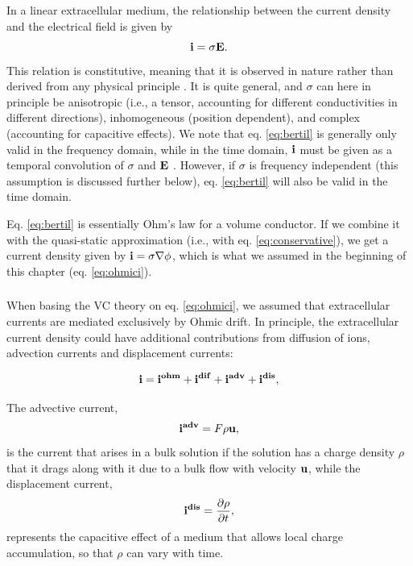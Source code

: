 \subsubsection{ }
In a linear extracellular medium, the relationship between the current density and the electrical field is given by
\begin{equation}
{\bf i} = \sigma {\bf E}.
\label{eq:bertil}
\end{equation}
This relation is constitutive, meaning that it is observed in nature rather than derived from any physical principle \citep{Nunez2006, Pettersen2012}. It is quite general, and $\sigma$ can here in principle be anisotropic (i.e., a tensor, accounting for different conductivities in different directions), inhomogeneous (position dependent), and complex (accounting for capacitive effects). We note that eq. \ref{eq:bertil} is generally only valid in the frequency domain, while in the time domain, ${\bf i}$ must be given as a temporal convolution of $\sigma$ and ${\bf E}$ \cite{Bedard2009}. However, if $\sigma$ is frequency independent (this assumption is discussed further below), eq. \ref{eq:bertil} will also be valid in the time domain.

Eq. \ref{eq:bertil} is essentially Ohm's law for a volume conductor. If we combine it with 
the quasi-static approximation (i.e., with eq. \ref{eq:conservative}), we get a current density given by ${\bf i} = \sigma \nabla \phi$, which is what we assumed in the beginning of this chapter (eq. \ref{eq:ohmici}).


\subsubsection{}
\label{sec:onlyohmic}
When basing the VC theory on eq. \ref{eq:ohmici}, we assumed that extracellular currents are mediated exclusively by Ohmic drift. In principle, the extracellular current density could have additional contributions from diffusion of ions, advection currents and displacement currents:

\begin{equation}
{\bf i} = {\bf i^{ohm}} + {\bf i^{dif}} + {\bf i^{adv}} + {\bf i^{dis}}, 
\label{eq:generalcurrent}
\end{equation}

The advective current, 
\begin{equation}
{\bf i^{adv}} = F \rho {\bf u}, 
\label{eq:iadv}
\end{equation}
is the current that arises in a bulk solution if the solution has a charge density $\rho$ that it drags along with it due to a bulk flow with velocity ${\bf u}$, while the displacement current,
\begin{equation}
{\bf i^{dis}} = \frac{\partial \rho}{\partial t},
\label{eq:idis}
\end{equation}
represents the capacitive effect of a medium that allows local charge accumulation, so that $\rho$ can vary with time.  

